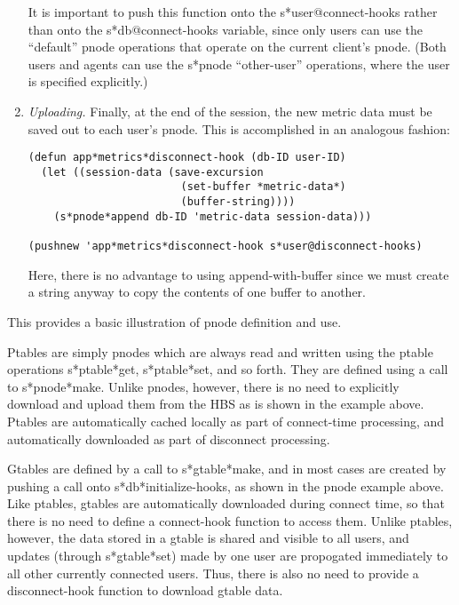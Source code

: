 \begin{enumerate}
  It is important to push this function onto the s*user@connect-hooks
  rather than onto the s*db@connect-hooks variable, since only users can
  use the ``default'' pnode operations that operate on the current client's
  pnode. (Both users and agents can use the s*pnode ``other-user''
  operations, where the user is specified explicitly.)

  
\item {\em Uploading.} Finally, at the end of the session, the new metric
  data must be saved out to each user's pnode.  This is accomplished in an
  analogous fashion:

  \small\begin{verbatim}
(defun app*metrics*disconnect-hook (db-ID user-ID)
  (let ((session-data (save-excursion
                        (set-buffer *metric-data*)
                        (buffer-string))))
    (s*pnode*append db-ID 'metric-data session-data)))

(pushnew 'app*metrics*disconnect-hook s*user@disconnect-hooks)
  \end{verbatim}\normalsize

  Here, there is no advantage to using append-with-buffer since we must
  create a string anyway to copy the contents of one buffer to another. 
\end{enumerate}


This provides a basic illustration of pnode definition and use.  

Ptables are simply pnodes which are always read and written using the
ptable operations s*ptable*get, s*ptable*set, and so forth.  They are
defined using a call to s*pnode*make. Unlike pnodes, however, there is no
need to explicitly download and upload them from the HBS as is shown in the
example above.  Ptables are automatically cached locally as part of
connect-time processing, and automatically downloaded as part of disconnect
processing.

Gtables are defined by a call to s*gtable*make, and in most cases are
created by pushing a call onto s*db*initialize-hooks, as shown in the
pnode example above.  Like ptables, gtables are automatically downloaded
during connect time, so that there is no need to define a connect-hook
function to access them.  Unlike ptables, however, the data stored in a
gtable is shared and visible to all users, and updates (through
s*gtable*set) made by one user are propogated immediately to all other
currently connected users.  Thus, there is also no need to provide a
disconnect-hook function to download gtable data. 

